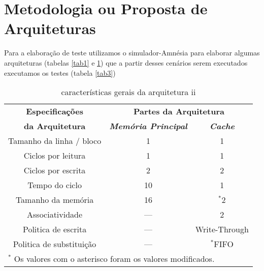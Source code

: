 \section{Metodologia ou Proposta de Arquiteturas}

    Para a elaboração de teste utilizamos o simulador-Amnésia para elaborar algumas
    arquiteturas (tabelas \ref{tab1} e \ref{tab2}) que a partir desses cenários serem executados
    executamos os testes (tabela \ref{tab3})

    \begin{table}[!t]
    \caption{características gerais da arquitetura ii}
    \centering
        \begin{tabular}{|c|c|c|}
            \hline
            \textbf{Especificações} & \multicolumn{2}{|c|}{\textbf{Partes da Arquitetura}} \\
            \cline{2-3} 
            \textbf{da Arquitetura} & \textbf{\textit{Memória Principal}}& \textbf{\textit{Cache}} \\
            \hline
            Tamanho da linha / bloco & 1 & 1  \\
            \hline
            Ciclos por leitura & 1 & 1  \\
            \hline
            Ciclos por escrita & 2 & 2  \\
            \hline
            Tempo do ciclo & 10 & 1  \\
            \hline
            Tamanho da memória & 16 & {$^{\mathrm{*}}$}2  \\
            \hline
            Associatividade & --- & 2  \\
            \hline
            Politica de escrita & --- & Write-Through  \\
            \hline
            Politica de substituição & --- & {$^{\mathrm{*}}$}FIFO  \\
            \hline
            \multicolumn{3}{l}{$^{\mathrm{*}}$ Os valores com o asterisco foram os valores modificados.}
        \end{tabular}
        \label{tab2}
    \end{table}

